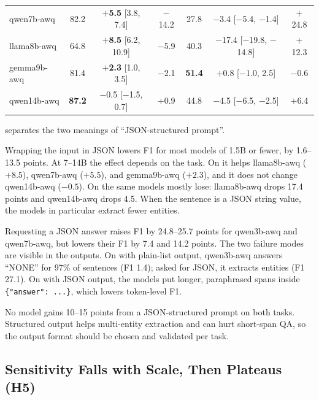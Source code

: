 \begin{table}[t]
{\begin{tabular}{@{}lcccccc@{}}
        qwen7b-awq    & 82.2 & \textbf{$+$5.5} [3.8, 7.4] & $-$14.2 & 27.8 & $-$3.4 [$-$5.4, $-$1.4] & $+$24.8 \\
        llama8b-awq   & 64.8 & \textbf{$+$8.5} [6.2, 10.9] & $-$5.9 & 40.3 & $-$17.4 [$-$19.8, $-$14.8] & $+$12.3 \\
        gemma9b-awq   & 81.4 & \textbf{$+$2.3} [1.0, 3.5] & $-$2.1 & \textbf{51.4} & $+$0.8 [$-$1.0, 2.5] & $-$0.6 \\
        qwen14b-awq   & \textbf{87.2} & $-$0.5 [$-$1.5, 0.7] & $+$0.9 & 44.8 & $-$4.5 [$-$6.5, $-$2.5] & $+$6.4 \\
        \bottomrule
    \end{tabular}
    }
\end{table}

 separates the two meanings of ``JSON-structured prompt''.

 Wrapping the input in JSON lowers F1 for most models of 1.5B or fewer, by 1.6--13.5 points. At 7--14B the effect depends on the task. On \squad it helps llama8b-awq ($+8.5$), qwen7b-awq ($+5.5$), and gemma9b-awq ($+2.3$), and it does not change qwen14b-awq ($-0.5$). On \conll the same models mostly lose: llama8b-awq drops 17.4 points and qwen14b-awq drops 4.5. When the sentence is a JSON string value, the \llama models in particular extract fewer entities.

 Requesting a JSON answer raises \conll F1 by 24.8--25.7 points for qwen3b-awq and qwen7b-awq, but lowers their \squad F1 by 7.4 and 14.2 points. The two failure modes are visible in the outputs. On \conll with plain-list output, qwen3b-awq answers ``NONE'' for 97\% of sentences (F1 1.4); asked for JSON, it extracts entities (F1 27.1). On \squad with JSON output, the \qwen models put longer, paraphrased spans inside \texttt{\{"answer": ...\}}, which lowers token-level F1.

 No model gains 10--15 points from a JSON-structured prompt on both tasks. Structured output helps multi-entity extraction and can hurt short-span QA, so the output format should be chosen and validated per task.

\subsection{Sensitivity Falls with Scale, Then Plateaus (H5)}
\label{sec:res_scale}

